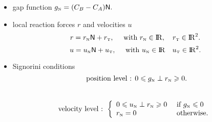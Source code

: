 {\begin{minipage}[c]{0.45\linewidth}
\begin{tikzpicture}
    \end{tikzpicture}
  \end{minipage}
\begin{minipage}[c]{0.49\linewidth}
    \begin{itemize}
    \item gap function $ g_{\n} = (C_B-C_A) \sf N.$
    \item local reaction forces $r$ and  velocities $u$
      $$r =  r_\n {\sf N} + r_\t, \quad \text{ with  } r_\n \in \nbR, \quad r_\t \in \nbR^2.$$
      $$u =  u_\n {\sf N} + u_\t, \quad \text{ with } u_\n \in \nbR \quad u_\t \in \nbR^2.$$
    \item Signorini conditions
      $$  \text{ position level : }  0 \leq g_{\n} \perp r_\n \geq 0.$$\\
      $$ \text{velocity level : }\left\{\begin{array}{ll}
            0 \leq u_{\n} \perp r_\n \geq 0  &\text{ if } g_{\n} \leq 0\\
            r_{\n} =0 &\text{ otherwise}.
          \end{array}\right.$$
    \end{itemize}

  \end{minipage}
}

